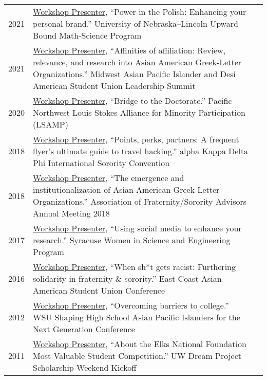 \documentclass[11pt]{article}
\begin{document}
{{\begin{longtable}{Rp{0.75in}p{5.0in}}
\footnotesize{2021} &
\href{https://newsroom.unl.edu/announce/trio-ubms/11966/73616}{{Workshop Presenter}}, ``Power in the Polish: Enhancing your personal brand.'' University of Nebraska–Lincoln Upward Bound Math-Science Program\\

\footnotesize{2021} &
\href{https://www.maasuls2021.org/workshops}{{Workshop Presenter}}, ``Affinities of affiliation: Review, relevance, and research into Asian American Greek-Letter Organizations.'' Midwest Asian Pacific Islander and Desi American Student Union Leadership Summit\\

\footnotesize{2020} & \href{https://depts.washington.edu/lsamp/}{{Workshop Presenter}}, ``Bridge to the Doctorate.'' Pacific Northwest Louis Stokes Alliance for Minority Participation (LSAMP)\\

\footnotesize{2018} & \href{https://web.archive.org/web/20190722125246/http://www.akdphi.org/workshops}{{Workshop Presenter}}, ``Points, perks, partners: A frequent flyer's ultimate guide to travel hacking.'' alpha Kappa Delta Phi International Sorority Convention\\

\footnotesize{2018} & \href{https://issuu.com/afa1976/docs/afaam-2018-programbook-final-noblee}{{Workshop Presenter}}, ``The emergence and institutionalization of Asian American Greek Letter Organizations.'' Association of Fraternity/Sorority Advisors Annual Meeting 2018\\

\footnotesize{2017} & \href{http://www.suwise.syr.edu/}{{Workshop Presenter}}, ``Using social media to enhance your research.'' Syracuse Women in Science and Engineering Program\\

\footnotesize{2016} & \href{https://web.archive.org/web/20160302043700/http://www.ecaasu2016.org/}{{Workshop Presenter}}, ``When sh*t gets racist: Furthering solidarity in fraternity \& sorority.'' East Coast Asian American Student Union Conference\\

\footnotesize{2012} & \href{https://shaping.wsu.edu/}{{Workshop Presenter}}, ``Overcoming barriers to college.'' WSU Shaping High School Asian Pacific Islanders for the Next Generation Conference\\

\footnotesize{2011} & \href{https://www.washington.edu/dreamproject/}{{Workshop Presenter}}, ``About the Elks National Foundation Most Valuable Student Competition.'' UW Dream Project Scholarship Weekend Kickoff\\


\end{longtable}}}
\end{document}
